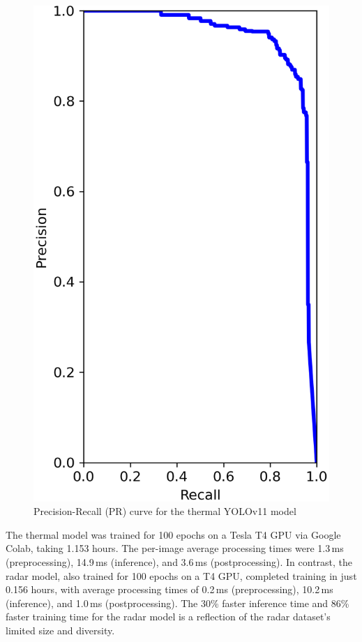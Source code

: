 \begin{figure} %
  \centering
  \includegraphics[width=\linewidth]{figs/Rory/APR_curve_therm.png} %
  \caption[Precision-Recall Curve for the Thermal CV Model]{Precision-Recall (PR) curve for the thermal YOLOv11 model}
  \label{fig:pr_curve}
\end{figure}

The thermal model was trained for 100 epochs on a Tesla T4 GPU via Google Colab, taking 1.153 hours. The per-image average processing times were 1.3\,ms (preprocessing), 14.9\,ms (inference), and 3.6\,ms (postprocessing). In contrast, the radar model, also trained for 100 epochs on a T4 GPU, completed training in just 0.156 hours, with average processing times of 0.2\,ms (preprocessing), 10.2\,ms (inference), and 1.0\,ms (postprocessing). The 30\% faster inference time and 86\% faster training time for the radar model is a reflection of the radar dataset's limited size and diversity.

